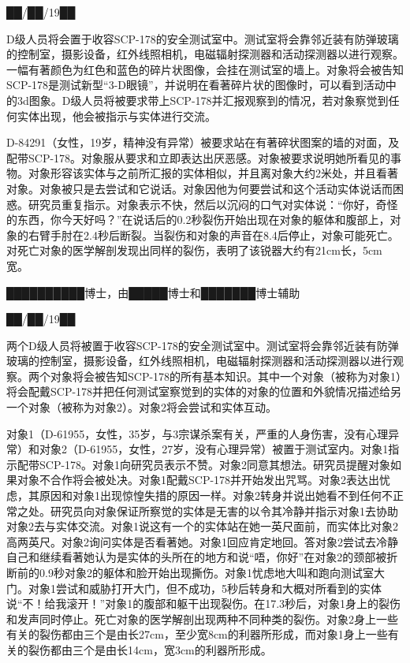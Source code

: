 ██\slash ██\slash 19██

D级人员将会置于收容SCP-178的安全测试室中。测试室将会靠邻近装有防弹玻璃的控制室，摄影设备，红外线照相机，电磁辐射探测器和活动探测器以进行观察。一幅有著颜色为红色和蓝色的碎片状图像，会挂在测试室的墙上。对象将会被告知SCP-178是测试新型“3-D眼镜”，并说明在看著碎片状的图像时，可以看到活动中的3d图象。D级人员将被要求带上SCP-178并汇报观察到的情况，若对象察觉到任何实体出现，他会被指示与实体进行交流。

D-84291（女性，19岁，精神没有异常）被要求站在有著碎状图案的墙的对面，及配带SCP-178。对象服从要求和立即表达出厌恶感。对象被要求说明她所看见的事物。对象形容该实体与之前所汇报的实体相似，并且离对象大约2米处，并且看著对象。对象被只是去尝试和它说话。对象因他为何要尝试和这个活动实体说话而困惑。研究员重复指示。对象表示不快，然后以沉闷的口气对实体说：“你好，奇怪的东西，你今天好吗？”在说话后的0.2秒裂伤开始出现在对象的躯体和腹部上，对象的右臂手肘在2.4秒后断裂。当裂伤和对象的声音在8.4后停止，对象可能死亡。对死亡对象的医学解剖发现出同样的裂伤，表明了该锐器大约有21cm长，5cm宽。


\hr


██████████博士，由█████博士和███████博士辅助

██\slash ██\slash 19██

两个D级人员将被置于收容SCP-178的安全测试室中。测试室将会靠邻近装有防弹玻璃的控制室，摄影设备，红外线照相机，电磁辐射探测器和活动探测器以进行观察。两个对象将会被告知SCP-178的所有基本知识。其中一个对象（被称为对象1）将会配戴SCP-178并把任何测试室察觉到的实体的对象的位置和外貌情况描述给另一个对象（被称为对象2）。对象2将会尝试和实体互动。

对象1（D-61955，女性，35岁，与3宗谋杀案有关，严重的人身伤害，没有心理异常）和对象2（D-61955，女性，27岁，没有心理异常）被置于测试室内。对象1指示配带SCP-178。对象1向研究员表示不赞。对象2同意其想法。研究员提醒对象如果对象不合作将会被处决。对象1配戴SCP-178并开始发出咒骂。对象2表达出忧虑，其原因和对象1出现惊惶失措的原因一样。对象2转身并说出她看不到任何不正常之处。研究员向对象保证所察觉的实体是无害的以令其冷静并指示对象1去协助对象2去与实体交流。对象1说这有一个的实体站在她一英尺面前，而实体比对象2高两英尺。对象2询问实体是否看著她。对象1回应肯定地回。答对象2尝试去冷静自己和继续看著她认为是实体的头所在的地方和说“唔，你好”在对象2的颈部被折断前的0.9秒对象2的躯体和脸开始出现撕伤。对象1忧虑地大叫和跑向测试室大门。对象1尝试和威胁打开大门，但不成功，5秒后转身和大概对所看到的实体说“不！给我滚开！”对象1的腹部和躯干出现裂伤。在17.3秒后，对象1身上的裂伤和发声同时停止。死亡对象的医学解剖出现两种不同种类的裂伤。对象2身上一些有关的裂伤都由三个是由长27cm，至少宽8cm的利器所形成，而对象1身上一些有关的裂伤都由三个是由长14cm，宽3cm的利器所形成。

